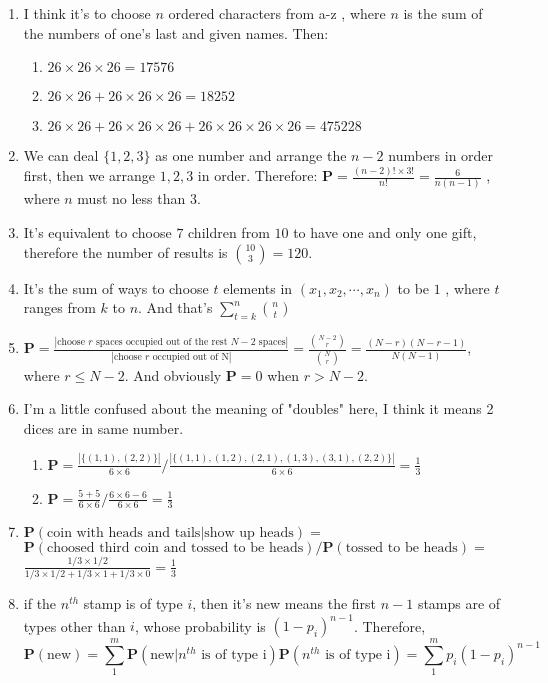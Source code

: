 \documentclass[12pt]{article}
\begin{document}
\begin{enumerate}
\begin{enumerate}
    \end{enumerate}
    \item I think it's to choose $n$ ordered characters from a-z , where $n$ is the sum of the numbers of one's last and given names. Then:
    \begin{enumerate}
        \item $26 \times 26 \times 26 = 17576$
        \item $26 \times 26 + 26 \times 26 \times 26 = 18252$
        \item $26 \times 26 + 26 \times 26 \times 26 + 26 \times 26 \times 26 \times 26 = 475228$
    \end{enumerate}
        \item 
        We can deal $\{1,2,3\}$ as one number and arrange the $n-2$ numbers in order first, then we arrange ${1,2,3}$ in order. Therefore:
        $\textbf{P} = \frac{ ( n - 2 ) ! \times 3 ! }{ n ! } = \frac{6}{n ( n - 1 )}$ , where $n$ must no less than $3$. 
        \item 
        It's equivalent to choose $7$ children from $10$ to have one and only one gift, therefore the number of results is $\binom{10}{3} = 120$.
        \item 
        It's the sum of ways to choose $t$ elements in $(x_1,x_2,\cdots,x_n)$ to be $1$ , where $t$ ranges from $k$ to $n$. And that's $\sum_{t=k}^{n} \binom{n}{t}$
        \item 
        $\textbf{P} = \frac{|\text{choose $r$ spaces occupied out of the rest $N-2$ spaces}|}{|\text{choose $r$ occupied out of N}|} = \frac{\binom{N - 2}{r}}{\binom{N}{r}} = \frac{(N - r) (N - r - 1)}{N (N - 1)}$,
        where $r \le N-2$. And obviously $\textbf{P} = 0$ when $r > N-2$.
        \item I'm a little confused about the meaning of "doubles" here, I think it means 2 dices are in same number.
    \begin{enumerate}
        \item $\textbf{P} = \frac{|\{(1,1),(2,2)\}|}{6 \times 6} / \frac{|\{(1,1),(1,2),(2,1),(1,3),(3,1),(2,2)\}|}{6 \times 6} = \frac{1}{3}$
        \item $\textbf{P} = \frac{5 + 5}{6 \times 6} / \frac{6 \times 6 - 6}{6 \times 6} = \frac{1}{3}$
    \end{enumerate}
    \item 
    $\textbf{P}(\text{coin with heads and tails} | \text{show up heads}) = $\\
    $\textbf{P}(\text{choosed third coin and tossed to be heads}) / \textbf{P}(\text{tossed to be heads}) = $\\
    $\frac{1/3 \times 1/2}{1/3 \times 1/2 + 1/3 \times 1 + 1/3 \times 0} = \frac{1}{3}$
    \item 
    if the $n^{th}$ stamp is of type $i$, then it's new means the first $n - 1$ stamps are of types other than $i$, whose probability is $(1 - p_i)^{n-1}$. Therefore, 
    $$\textbf{P}(\text{new}) = \sum_1^m \textbf{P}(\text{new} | \text{$n^{th}$ is of type i}) \textbf{P}(\text{$n^{th}$ is of type i}) = \sum_1^m p_i (1-p_i)^{n-1}$$
\end{enumerate}
\end{document}
